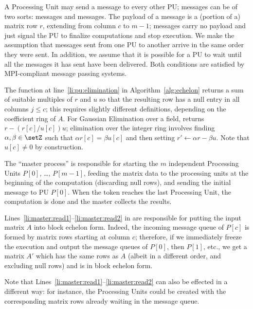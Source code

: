 A Processing Unit may send a message to every other PU; messages can
be of two sorts:  messages and  messages.  The
payload of a  message is a (portion of a) matrix row $r$, extending from
column $c$ to $m-1$;  messages carry no payload and just
signal the PU to finalize computations and stop execution.  We make
the assumption that messages sent from one PU to another arrive in the
same order they were sent.  In addition, we assume that it is possible
for a PU to wait until all the messages it has sent have been
delivered.  Both conditions are satisfied by MPI-compliant message
passing systems.

The  function at line~\ref{li:pu:elimination} in
Algorithm~\ref{alg:echelon} returns a sum of suitable multiples of $r$
and $u$ so that the resulting row has a null entry in all columns $j
\leq c$; this requires slightly different definitions, depending on
the coefficient ring of $A$.  For Gaussian Elimination over a field,
 returns $r - (r[c] / u[c]) u$; elimination over the
integer ring involves finding $\alpha, \beta \in \setZ$ such that $\alpha
r[c] = \beta u[c]$ and then setting $r' \gets \alpha r - \beta u$.
Note that $u[c] \not= 0$ by construction.

The ``master process'' is responsible for starting the $m$ independent
Processing Units $P[0]$, \ldots, $P[m-1]$, feeding the matrix data to
the processing units at the beginning of the computation (discarding
null rows), and sending the initial  message to PU $P[0]$.
When the  token reaches the last Processing Unit, the
computation is done and the master collects the results.

Lines~\ref{li:master:read1}--\ref{li:master:read2} in 
are responsible for putting the input matrix $A$ into block
echelon form. Indeed, the incoming message queue of $P[c]$ is formed
by matrix rows starting at column $c$; therefore, if we immediately
freeze the execution and output the message queues of $P[0]$, then
$P[1]$, etc., we get a matrix $A'$ which has the same rows as $A$
(albeit in a different order, and excluding null rows) and is in block echelon form.

Note that Lines~\ref{li:master:read1}--\ref{li:master:read2} can also be
effected in a different way: for instance, the Processing Units could
be created with the corresponding matrix rows already waiting in the
message queue.  

